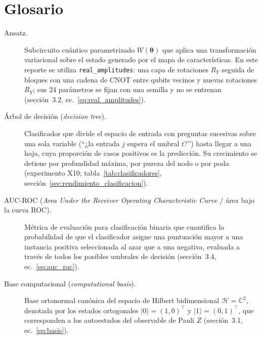 \section*{Glosario}

\begin{description}
  \item[Ansatz.] Subcircuito cuántico parametrizado $W(\boldsymbol{\theta})$ que aplica una transformación variacional sobre el estado generado por el mapa de características. En este reporte se utiliza \texttt{real\_amplitudes}: una capa de rotaciones $R_Y$ seguida de bloques con una cadena de CNOT entre qubits vecinos y nuevas rotaciones $R_Y$; sus 24 parámetros se fijan con una semilla y no se entrenan (sección~3.2, ec.~\ref{eq:real_amplitudes}).

  \item[Árbol de decisión (\textit{decision tree}).] Clasificador que divide el espacio de entrada con preguntas sucesivas sobre una sola variable (``¿la entrada $j$ supera el umbral $t$?'') hasta llegar a una hoja, cuya proporción de casos positivos es la predicción. Su crecimiento se detiene por profundidad máxima, por pureza del nodo o por poda (experimento X10; tabla~\ref{tab:clasificadores}, sección~\ref{sec:rendimiento_clasificacion}).

  \item[AUC-ROC (\textit{Area Under the Receiver Operating Characteristic Curve} / área bajo la curva ROC).] Métrica de evaluación para clasificación binaria que cuantifica la probabilidad de que el clasificador asigne una puntuación mayor a una instancia positiva seleccionada al azar que a una negativa, evaluada a través de todos los posibles umbrales de decisión (sección~3.4, ec.~\ref{eq:auc_roc}).

  \item[Base computacional (\textit{computational basis}).] Base ortonormal canónica del espacio de Hilbert bidimensional $\mathcal{H} = \mathbb{C}^2$, denotada por los estados ortogonales $|0\rangle = (1, 0)^\top$ y $|1\rangle = (0, 1)^\top$, que corresponden a los autoestados del observable de Pauli $Z$ (sección~3.1, ec.~\ref{eq:basis}).


\end{description}
